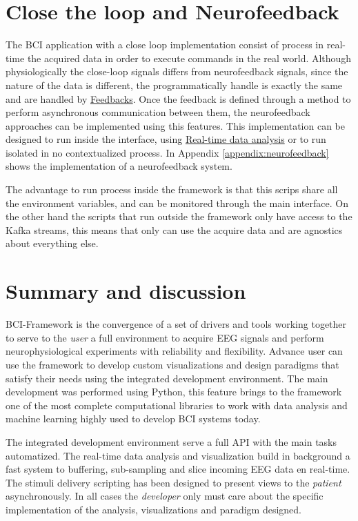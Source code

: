 \section{Close the loop and Neurofeedback}

The BCI application with a close loop implementation consist of process in real-time the acquired data in order to execute commands in the real world. Although physiologically the close-loop signals differs from neurofeedback signals, since the nature of the data is different, the programmatically handle is exactly the same and are handled by \hyperref[ch4:feedbacks]{Feedbacks}. Once the feedback is defined through a method to perform asynchronous communication between them, the neurofeedback approaches can be implemented using this features. This implementation can be designed to run inside the interface, using \hyperref[ch4:rt_data_analysis]{Real-time data analysis} or to run isolated in no contextualized process. In Appendix \ref{appendix:neurofeedback} shows the implementation of a neurofeedback system.

The advantage to run process inside the framework is that this scrips share all the environment variables, and can be monitored through the main interface. On the other hand the scripts that run outside the framework only have access to the Kafka streams, this means that only can use the acquire data and are agnostics about everything else.




\section{Summary and discussion}

BCI-Framework is the convergence of a set of drivers and tools working together to serve to the \textit{user} a full environment to acquire EEG signals and perform neurophysiological experiments with reliability and flexibility. Advance user can use the framework to develop custom visualizations and design paradigms that satisfy their needs using the integrated development environment. The main development was performed using Python, this feature brings to the framework one of the most complete computational libraries to work with data analysis and machine learning highly used to develop \gls*{BCI} systems today. 

The integrated development environment serve a full \gls*{API} with the main tasks automatized. The real-time data analysis and visualization build in background a fast system to buffering, sub-sampling and slice incoming EEG data en real-time. The stimuli delivery scripting has been designed to present views to the \textit{patient} asynchronously. In all cases the \textit{developer} only must care about the specific implementation of the analysis, visualizations and paradigm designed.

